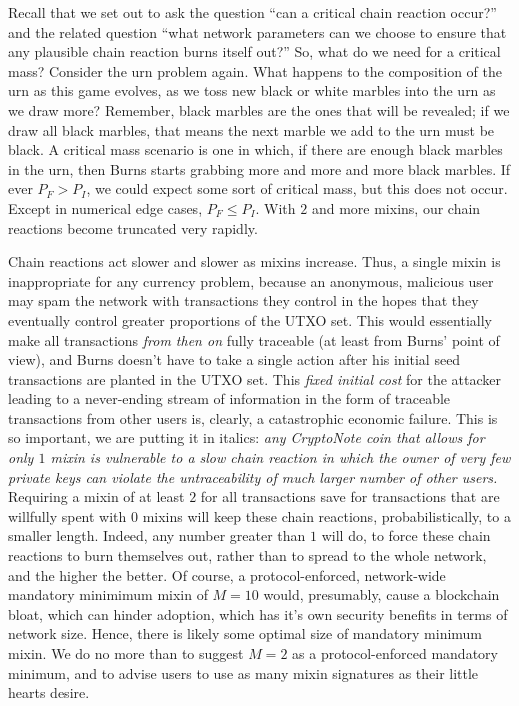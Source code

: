 \documentclass{mrl}
\begin{document}
Recall that we set out to ask the question ``can a critical chain reaction occur?'' and the related question ``what network parameters can we choose to ensure that any plausible chain reaction burns itself out?'' So, what do we need for a critical mass? Consider the urn problem again. What happens to the composition of the urn as this game evolves, as we toss new black or white marbles into the urn as we draw more? Remember, black marbles are the ones that will be revealed; if we draw all black marbles, that means the next marble we add to the urn must be black. A critical mass scenario is one in which, if there are enough black marbles in the urn, then Burns starts grabbing more and more and more black marbles. If ever $P_F > P_I$, we could expect some sort of critical mass, but this does not occur. Except in numerical edge cases, $P_F \leq P_I$. With $2$ and more mixins, our chain reactions become truncated very rapidly.

Chain reactions act slower and slower as mixins increase. Thus, a single mixin is inappropriate for any currency problem, because an anonymous, malicious user may spam the network with transactions they control in the hopes that they eventually control greater proportions of the UTXO set. This would essentially make all transactions \emph{from then on} fully traceable (at least from Burns' point of view), and Burns doesn't have to take a single action after his initial seed transactions are planted in the UTXO set. This \emph{fixed initial cost} for the attacker leading to a never-ending stream of information in the form of traceable transactions from other users is, clearly, a catastrophic economic failure. This is so important, we are putting it in italics: \emph{any CryptoNote coin that allows for only $1$ mixin is vulnerable to a slow chain reaction in which the owner of very few private keys can violate the untraceability of much larger number of other users.} Requiring a mixin of at least $2$ for all transactions save for transactions that are willfully spent with $0$ mixins will keep these chain reactions, probabilistically, to a smaller length. Indeed, any number greater than $1$ will do, to force these chain reactions to burn themselves out, rather than to spread to the whole network, and the higher the better. Of course, a protocol-enforced, network-wide mandatory minimimum mixin of $M=10$ would, presumably, cause a blockchain bloat, which can hinder adoption, which has it's own security benefits in terms of network size. Hence, there is likely some optimal size of mandatory minimum mixin. We do no more than to suggest $M=2$ as a protocol-enforced mandatory minimum, and to advise users to use as many mixin signatures as their little hearts desire.
\end{document}
